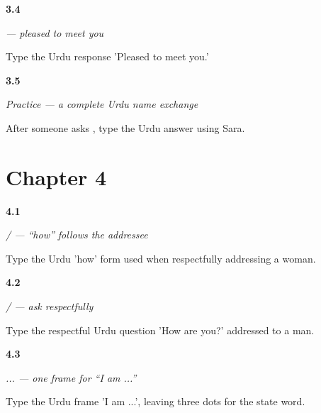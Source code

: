 \noindent\begin{minipage}[t]{\linewidth}
\raggedright
\hypertarget{review-UR-C03-khushi-hui-close}{\textbf{3.4}} \emph{      — pleased to meet you}\par
\small Type the Urdu response 'Pleased to meet you.'
\end{minipage}\par\medskip

\noindent\begin{minipage}[t]{\linewidth}
\raggedright
\hypertarget{review-UR-C03-practice-next-line}{\textbf{3.5}} \emph{Practice — a complete Urdu name exchange}\par
\small After someone asks     , type the Urdu answer using Sara.
\end{minipage}\par\medskip

\section*{Chapter 4}

\noindent\begin{minipage}[t]{\linewidth}
\raggedright
\hypertarget{review-UR-C04-kaise-kaisi-woman}{\textbf{4.1}} \emph{ /  — “how” follows the addressee}\par
\small Type the Urdu 'how' form used when respectfully addressing a woman.
\end{minipage}\par\medskip

\noindent\begin{minipage}[t]{\linewidth}
\raggedright
\hypertarget{review-UR-C04-aap-kaise-hain-man}{\textbf{4.2}} \emph{   /    — ask respectfully}\par
\small Type the respectful Urdu question 'How are you?' addressed to a man.
\end{minipage}\par\medskip

\noindent\begin{minipage}[t]{\linewidth}
\raggedright
\hypertarget{review-UR-C04-main-hun-frame}{\textbf{4.3}} \emph{ ...  — one frame for “I am ...”}\par
\small Type the Urdu frame 'I am ...', leaving three dots for the state word.
\end{minipage}\par\medskip

